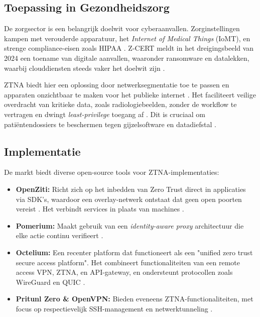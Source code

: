 \subsection{Toepassing in Gezondheidszorg}
De zorgsector is een belangrijk doelwit voor cyberaanvallen. Zorginstellingen kampen met verouderde apparatuur, het \textit{Internet of Medical Things} (IoMT), en strenge compliance-eisen zoals HIPAA \parencite{anacyber2024}. Z-CERT meldt in het dreigingsbeeld van 2024 een toename van digitale aanvallen, waaronder ransomware en datalekken, waarbij clouddiensten steeds vaker het doelwit zijn \parencite{zcert2024}.

ZTNA biedt hier een oplossing door netwerksegmentatie toe te passen en apparaten onzichtbaar te maken voor het publieke internet \parencite{Wal2022}. Het faciliteert veilige overdracht van kritieke data, zoals radiologiebeelden, zonder de workflow te vertragen en dwingt \textit{least-privilege} toegang af \parencite{appgate2023}. Dit is cruciaal om patiëntendossiers te beschermen tegen gijzelsoftware en datadiefstal \parencite{hoop2024}.

\subsection{Implementatie}
De markt biedt diverse open-source tools voor ZTNA-implementaties:
\begin{itemize}
	\item \textbf{OpenZiti:} Richt zich op het inbedden van Zero Trust direct in applicaties via SDK's, waardoor een overlay-netwerk ontstaat dat geen open poorten vereist \parencite{aimultiple2025}. Het verbindt services in plaats van machines \parencite{OpenZiti2025}.
	\item \textbf{Pomerium:} Maakt gebruik van een \textit{identity-aware proxy} architectuur die elke actie continu verifieert \autocite{aimultiple2025}.
	\item \textbf{Octelium:} Een recenter platform dat functioneert als een "unified zero trust secure access platform". Het combineert functionaliteiten van een remote access VPN, ZTNA, en API-gateway, en ondersteunt protocollen zoals WireGuard en QUIC \autocite{octelium2025}.
	\item \textbf{Pritunl Zero \& OpenVPN:} Bieden eveneens ZTNA-functionaliteiten, met focus op respectievelijk SSH-management en netwerktunneling \autocite{aimultiple2025}.
\end{itemize}

